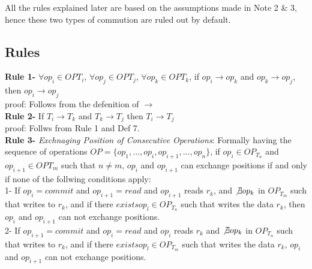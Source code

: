 \documentclass[a4paper, 11pt]{article}
\begin{document}
All the rules explained later are based on the assumptions made in Note 2 \& 3, hence these two types of commution are ruled out by default.\\




\subsection{Rules}

\textbf{Rule 1-} $\forall op_i \in  OP{T_i}$, $\forall op_j \in  OP{T_j}$, $\forall op_k \in  OP{T_k}$, if $op_i \rightarrow op_k$ and  $op_k \rightarrow op_j$, then $op_i \rightarrow op_j$ \\

proof: Follows from the defenition of $\rightarrow$ \\


\textbf{Rule 2-} If $T_i \rightarrow T_k$ and $T_k \rightarrow T_j$ then $T_i \rightarrow T_j$ \\

proof: Follws from Rule 1 and Def 7. \\ 

\textbf{Rule 3-} \emph{Exchnaging Position of Consecutive Operations}: Formally having the sequence of operations $OP = \{op_1,...,op_i,op_{i+1},...,op_n\}$, if $op_i \in OP_{T_n}$ and $op_{i+1} \in OP{T_m}$ such that $ n\neq m$, $op_i$ and $op_{i+1}$ can exchange positions if and only if none of the follwing conditions apply:\\

\hspace{8mm} 1- If $op_i = {commit}$ and $op_{i+1} = {read}$ and $op_{i+1}$ reads $r_k$, and $\not \exists op_k$ in $OP_{T_m}$ such that writes to $r_k$, and if there  $exists op_l \in OP_{T_n}$ such that writes the data $r_k$, then $op_i$ and $op_{i+1}$ can not exchange positions.\\ 

\hspace{8mm} 2- If $op_{i+1} = {commit}$ and $op_{i} = {read}$ and $op_{i}$ reads $r_k$ and $\not \exists op_k$ in $OP_{T_n}$ such that writes to $r_k$, and if there $exists op_l \in OP_{T_m}$ such that writes the data $r_k$, $op_i$ and $op_{i+1}$ can not exchange positions.\\ 
\end{document}
